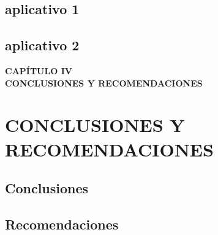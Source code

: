 \documentclass[11pt,oneside,letterpaper]{book}
\begin{document}
\section{aplicativo 1}
\lipsum[1]

\section{aplicativo 2}
\lipsum[1]

\newpage
\thispagestyle{empty}
\vspace*{0.35\textheight}
\begin{center}
	{\Huge\textbf{CAPÍTULO IV}} \\[0.5cm]
	{\Huge\textbf{CONCLUSIONES Y RECOMENDACIONES}}
\end{center}

\newpage
\chapter{CONCLUSIONES Y RECOMENDACIONES}
\thispagestyle{fancy}

\section{Conclusiones}
\lipsum[1]

\section{Recomendaciones}
\lipsum[1]

\printbibliography[
	heading=bibintoc,
	title={BIBLIOGRAFÍA}
]
\end{document}
